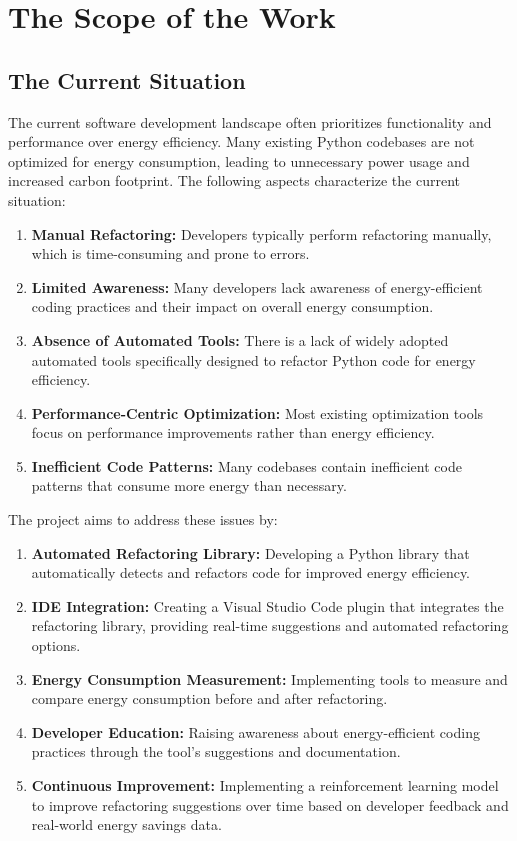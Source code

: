 \documentclass[12pt]{article}
\begin{document}
\section{The Scope of the Work}
\subsection{The Current Situation}

  The current software development landscape often prioritizes functionality and performance over energy efficiency. Many existing Python codebases are not optimized for energy consumption, leading to unnecessary power usage and increased carbon footprint. The following aspects characterize the current situation:
  \begin{enumerate}
    \item \textbf{Manual Refactoring:} Developers typically perform refactoring manually, which is time-consuming and prone to errors.
    \item \textbf{Limited Awareness:} Many developers lack awareness of energy-efficient coding practices and their impact on overall energy consumption.
    \item \textbf{Absence of Automated Tools:} There is a lack of widely adopted automated tools specifically designed to refactor Python code for energy efficiency.
    \item \textbf{Performance-Centric Optimization:} Most existing optimization tools focus on performance improvements rather than energy efficiency.
    \item \textbf{Inefficient Code Patterns:} Many codebases contain inefficient code patterns that consume more energy than necessary.
  \end{enumerate}

  The project aims to address these issues by:
  \begin{enumerate}
    \item \textbf{Automated Refactoring Library:} Developing a Python library that automatically detects and refactors code for improved energy efficiency.
    \item \textbf{IDE Integration:} Creating a Visual Studio Code plugin that integrates the refactoring library, providing real-time suggestions and automated refactoring options.
    \item \textbf{Energy Consumption Measurement:} Implementing tools to measure and compare energy consumption before and after refactoring.
    \item \textbf{Developer Education:} Raising awareness about energy-efficient coding practices through the tool's suggestions and documentation.
    \item \textbf{Continuous Improvement:} Implementing a reinforcement learning model to improve refactoring suggestions over time based on developer feedback and real-world energy savings data.
  \end{enumerate}  
\end{document}
